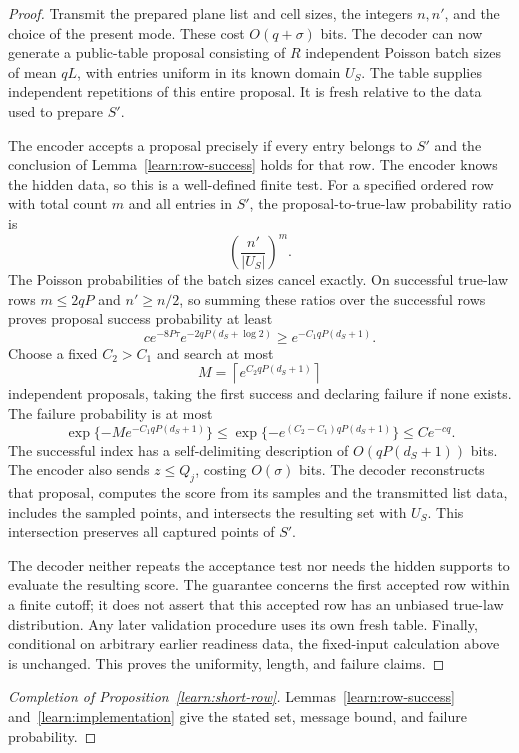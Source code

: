 \begin{proof}
Transmit the prepared plane list and cell sizes, the integers $n,n'$,
and the choice of the present mode. These cost $O(q+\sigma)$ bits.
The decoder can now generate a public-table proposal consisting of
$R$ independent Poisson batch sizes of mean $qL$, with entries uniform
in its known domain $U_S$. The table supplies independent repetitions
of this entire proposal. It is fresh relative to the data used to
prepare $S'$.

The encoder accepts a proposal precisely if every entry belongs to
$S'$ and the conclusion of Lemma~\ref{learn:row-success} holds for
that row. The encoder knows the hidden data, so this is a well-defined
finite test. For a specified ordered row with total count $m$ and all
entries in $S'$, the proposal-to-true-law probability ratio is
\[
 \left(\frac{n'}{|U_S|}\right)^m.
\]
The Poisson probabilities of the batch sizes cancel exactly. On
successful true-law rows $m\le2qP$ and $n'\ge n/2$, so summing these
ratios over the successful rows proves proposal success probability
at least
\[
 c e^{-8P\tau}e^{-2qP(d_S+\log2)}
 \ge e^{-C_1qP(d_S+1)}.
\]
Choose a fixed $C_2>C_1$ and search at most
\[
 M=\left\lceil e^{C_2qP(d_S+1)}\right\rceil
\]
independent proposals, taking the first success and declaring failure
if none exists. The failure probability is at most
\[
 \exp\{-M e^{-C_1qP(d_S+1)}\}
 \le \exp\{-e^{(C_2-C_1)qP(d_S+1)}\}
 \le C e^{-cq}.
\]
The successful index has a self-delimiting description of
$O(qP(d_S+1))$ bits. The encoder also sends $z\le Q_j$, costing
$O(\sigma)$ bits. The decoder reconstructs that proposal, computes
the score from its samples and the transmitted list data, includes
the sampled points, and intersects the resulting set with $U_S$.
This intersection preserves all captured points of $S'$.

The decoder neither repeats the acceptance test nor needs the hidden
supports to evaluate the resulting score. The guarantee concerns the
first accepted row within a finite cutoff; it does not assert that
this accepted row has an unbiased true-law distribution. Any later
validation procedure uses its own fresh table. Finally, conditional
on arbitrary earlier readiness data, the fixed-input calculation above
is unchanged. This proves the uniformity, length, and failure claims.
\end{proof}

\begin{proof}[Completion of Proposition~\ref{learn:short-row}]
Lemmas~\ref{learn:row-success} and~\ref{learn:implementation} give
the stated set, message bound, and failure probability.
\end{proof}

